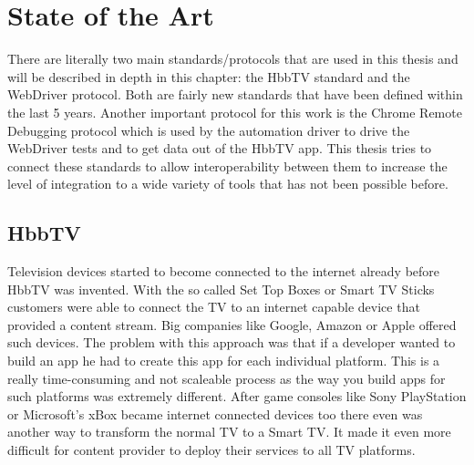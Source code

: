%
%

\chapter{State of the Art\label{cha:state_of_the_art}}

There are literally two main standards/protocols that are used in this thesis and will be described in
depth in this chapter: the HbbTV standard and the WebDriver protocol. Both are fairly new standards that
have been defined within the last 5 years. Another important protocol for this work is the Chrome Remote
Debugging protocol which is used by the automation driver to drive the WebDriver tests and to get data out of
the HbbTV app. This thesis tries to connect these standards to allow interoperability between them to
increase the level of integration to a wide variety of tools that has not been possible before.

\section{HbbTV\label{sec:hbbtv}}


Television devices started to become connected to the internet already before HbbTV was invented. With
the so called Set Top Boxes or Smart TV Sticks customers were able to connect the TV to an internet
capable device that provided a content stream. Big companies like Google, Amazon or Apple offered such
devices. The problem with this approach was that if a developer wanted to build an app he had to create
this app for each individual platform. This is a really time-consuming and not scaleable process as
the way you build apps for such platforms was extremely different. After game consoles like Sony PlayStation
or Microsoft's xBox became internet connected devices too there even was another way to transform
the normal TV to a Smart TV. It made it even more difficult for content provider to deploy their services
to all TV platforms.

